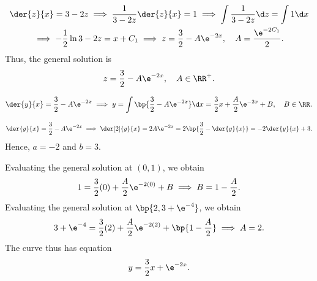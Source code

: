 \begin{solution}
    \begin{ppart}
        \begin{gather*}
            \der{z}{x} = 3-2z \implies \frac{1}{3-2z} \der{z}{x} = 1 \implies \int \frac{1}{3-2z} \d z = \int 1 \d x\\
            \implies -\frac12 \ln{3-2z} = x + C_1 \implies z = \frac32 - A \e^{-2x}, \quad A = \frac{\e^{-2C_1}}{2}.
        \end{gather*}
        Thus, the general solution is \[z = \frac32 - A \e^{-2x}, \quad A \in \RR^+.\]
    \end{ppart}
    \begin{ppart}
        \begin{gather*}
            \der{y}{x} = \frac32 - A \e^{-2x} \implies y = \int \bp{\frac32 - A \e^{-2x}} \d x = \frac32 x + \frac{A}2 \e^{-2x} + B, \quad B \in \RR.
        \end{gather*}
    \end{ppart}
    \begin{ppart}
        \[\der{y}{x} = \frac32 - A\e^{-2x} \implies \der[2]{y}{x} = 2A \e^{-2x} = 2\bp{\frac32 - \der{y}{x}} = -2\der{y}{x} + 3.\] Hence, $a = -2$ and $b = 3$.
    \end{ppart}
    \begin{ppart}
        Evaluating the general solution at $(0, 1)$, we obtain \[1 = \frac32 (0) + \frac{A}{2} \e^{-2(0)} + B \implies B = 1 - \frac{A}{2}.\] Evaluating the general solution at $\bp{2, 3 + \e^{-4}}$, we obtain \[3 + \e^{-4} = \frac32 (2) + \frac{A}{2} \e^{-2(2)} + \bp{1 - \frac{A}{2}} \implies A = 2.\] The curve thus has equation \[y = \frac32 x + \e^{-2x}.\]

        \begin{center}
        \end{center}
    \end{ppart}
\end{solution}

